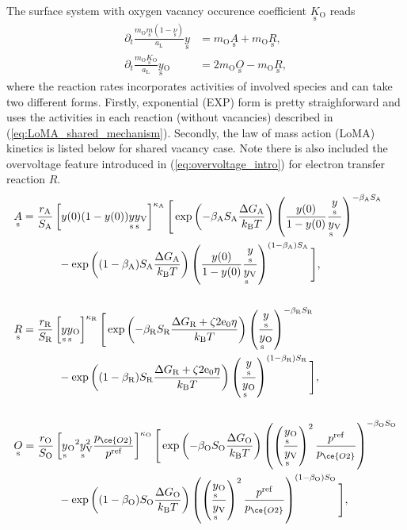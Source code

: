 \documentclass{article}
\numberwithin{equation}{section}
\newcommand{\us}[1]{\underset{\textrm{s}}{#1}{}}
\def\kB{k_\mathrm{B}}
\def\Ox{\mathrm{O}}
\newcommand{\OO}{{\ce{O2}}}
\def\aL{a_\mathrm{L}}
\def\ys{\us y}
\newcommand{\ysV}{\us y_{\textrm{V}}}
\def\y0{{y(0)}}
\def\yOs{{\us y_\textrm{O}}}
\def\efac{\zeta}
\def\OC{\us K_\Ox}
\def\rA{r_\textrm{A}}
\def\rR{r_\textrm{R}}
\def\rO{r_\textrm{O}}
\def\DGA{\Delta G_\textrm{A}  }
\def\DGR{\Delta G_\textrm{R}  }
\def\DGO{\Delta G_\textrm{O}  }
\def\betaA{\beta_\textrm{A}}
\def\betaR{\beta_\textrm{R}}
\def\betaO{\beta_\textrm{O}}
\def\SA{S_\textrm{A}}
\def\SR{S_\textrm{R}}
\def\SO{S_\textrm{O}}
\newcommand{\kaA}{{\kappa_\textrm{A}}}
\newcommand{\kaR}{{\kappa_\textrm{R}}}
\newcommand{\kaO}{{\kappa_\textrm{O}}}
\def\REF{\textrm{ref}}
\begin{document}
The surface system with oxygen vacancy occurence coefficient $\OC$ reads
\begin{subequations}
\begin{align}
\partial_t \frac{m_\Ox \us m (1- \us \nu)}{\aL} \ys
&=
m_\Ox \us A
+
m_\Ox \us R,
\\
\partial_t \frac{m_\Ox \OC }{\aL} \yOs
&=
2 m_\Ox \us O
-
m_\Ox \us R,
\end{align}
\end{subequations}
where the reaction rates incorporates activities of involved species and can take two different forms. Firstly, exponential (EXP) form is pretty straighforward and uses the activities in each reaction (without vacancies) described in (\ref{eq:LoMA_shared_mechanism}). Secondly, the law of mass action (LoMA) kinetics is listed below for shared vacancy case. Note there is also included the overvoltage feature introduced in (\ref{eq:overvoltage_intro}) for electron transfer reaction $R$.
\begin{subequations}
\begin{align}
&\us A
=
\frac{\rA}{\SA}
\left[
    y(0) (1-y(0)) \ys \ysV  
\right]^\kaA
\Bigg[
	\exp
	\left(
		{-\betaA \SA \frac{\DGA}{\kB T}}
	\right)
	\left(
		\frac{\y0}{1 - \y0}
		\frac{\ys}{\ysV}
	\right)^{-\betaA \SA}
\\ \nonumber
	&\quad \quad \quad \quad	
	-
	\exp
	\left(
		{(1-\betaA) \SA \frac{\DGA}{\kB T}}
	\right)
	\left(
		\frac{\y0}{1 - \y0 }
		\frac{\ys}{\ysV}
	\right)^{(1-\betaA) \SA}
\Bigg],
\\ \nonumber
\\
&\us R
=
\frac{\rR}{\SR}
\left[
  \ys \yOs 
\right]^\kaR
\Bigg[
	\exp
	\left(
		{-\betaR \SR \frac{\DGR + \efac 2 \text{e}_0 \eta}{\kB T}}
	\right)
	\left(
		\frac{\ys}{\yOs}
	\right)^{-\betaR \SR}
\\ \nonumber
	& \quad \quad \quad \quad	
	-
	\exp
	\left(
		{(1 - \betaR) \SR \frac{\DGR + \efac 2 \text{e}_0 \eta}{\kB T}}
	\right)
	\left(
		\frac{\ys}{\yOs}
	\right)^{(1-\betaR) \SR}
\Bigg],
\\ \nonumber
\\
&\us O
=
\frac{\rO}{\SO}
\left[
    \yOs^2 \ysV^2 \frac{p_\OO}{p^\REF}
\right]^\kaO
\Bigg[
	\exp
	\left(
		{-\betaO \SO \frac{\DGO}{\kB T}}
	\right)
	\left(
		\left(
			\frac{\yOs}{\ysV}
		\right)^2
   \frac{p^\REF}{p_\OO}
	\right)^{-\betaO \SO}
\\ \nonumber
	&\quad \quad \quad \quad	
	-
	\exp
	\left(
		{(1-\betaO) \SO \frac{\DGO}{\kB T}}
	\right)
	\left(
		\left(
			\frac{\yOs}{\ysV}
		\right)^2
    \frac{p^\REF}{p_\OO}
	\right)^{(1 - \betaO) \SO}
\Bigg],
\end{align}
\end{subequations}
\end{document}
